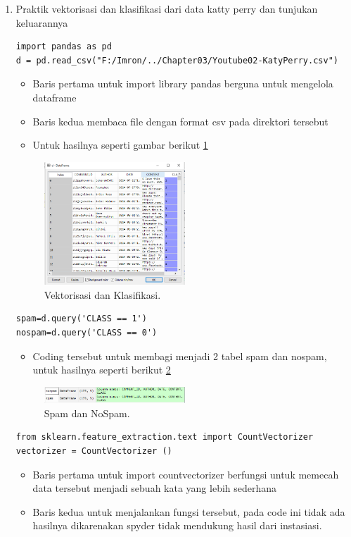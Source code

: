 \begin{enumerate}
\item Praktik vektorisasi dan klasifikasi dari data katty perry dan tunjukan keluarannya
\begin{verbatim}
import pandas as pd
d = pd.read_csv("F:/Imron/../Chapter03/Youtube02-KatyPerry.csv")
\end{verbatim}
\begin{itemize}
\item Baris pertama untuk import library pandas berguna untuk mengelola dataframe
\item Baris kedua membaca file dengan format csv pada direktori tersebut
\item Untuk hasilnya seperti gambar berikut \ref{yt1}
\end{itemize}
		\begin{figure}[ht]
		\centerline{\includegraphics[width=0.5\textwidth]{figures/im/yt1.png}}
		\caption{Vektorisasi dan Klasifikasi.}
		\label{yt1}
		\end{figure}

\begin{verbatim}
spam=d.query('CLASS == 1')
nospam=d.query('CLASS == 0')
\end{verbatim}
\begin{itemize}
\item Coding tersebut untuk membagi menjadi 2 tabel spam dan nospam, untuk hasilnya seperti berikut \ref{yt2}
\end{itemize}
		\begin{figure}[ht]
		\centerline{\includegraphics[width=0.5\textwidth]{figures/im/yt2.png}}
		\caption{Spam dan NoSpam.}
		\label{yt2}
		\end{figure}

\begin{verbatim}
from sklearn.feature_extraction.text import CountVectorizer
vectorizer = CountVectorizer ()
\end{verbatim}
\begin{itemize}
\item Baris pertama untuk import countvectorizer berfungsi untuk memecah data tersebut menjadi sebuah kata yang lebih sederhana
\item Baris kedua untuk menjalankan fungsi tersebut, pada code ini tidak ada hasilnya dikarenakan spyder tidak mendukung hasil dari instasiasi.
\end{itemize}


\end{enumerate}
